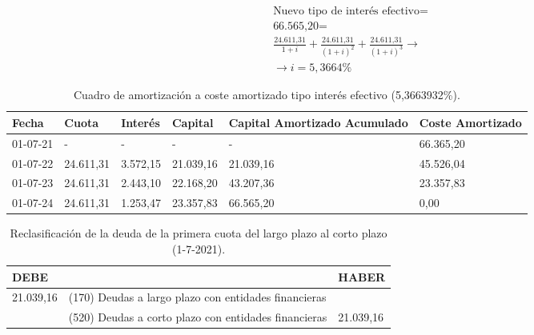 \begin{align*}
    \text{Nuevo tipo de interés efectivo}  = \\
    \text{66.565,20} = \\
    \frac{\text{24.611,31}}{1 + i} + \frac{\text{24.611,31}}{(1 + i)^2} + \frac{\text{24.611,31}}{(1 + i)^3} \rightarrow \\
    \rightarrow i = 5,3664\%
\end{align*}

\begin{table}[H]
    \centering
    \begin{tabular}{|p{2cm}|p{2cm}|p{2cm}|p{2cm}|p{2cm}|p{2cm}|}
    \hline
    \rowcolor{blue!30}
    \textbf{Fecha} & \textbf{Cuota} & \textbf{Interés} & \textbf{Capital} & \textbf{Capital Amortizado Acumulado} & \textbf{Coste Amortizado} \\
    \hline
    01-07-21 & - & - & - & - & 66.365,20 \\
    \hline
    01-07-22 & 24.611,31 & 3.572,15 & 21.039,16 & 21.039,16 & 45.526,04 \\
    \hline
    01-07-23 & 24.611,31 & 2.443,10 & 22.168,20 & 43.207,36 & 23.357,83 \\
    \hline
    01-07-24 & 24.611,31 & 1.253,47 & 23.357,83 & 66.565,20 & 0,00 \\
    \hline
    \end{tabular}
    \caption{Cuadro de amortización a coste amortizado tipo interés efectivo (5,3663932\%).}
    \label{tabla:amortizacion_coste_amortizado}
\end{table}


\begin{table}[H]
    \centering
    \begin{tabular}{|p{2cm}|p{6cm}|p{2cm}|}
    \hline
    \rowcolor{blue!30}
    \textbf{DEBE} & \textbf{} & \textbf{HABER} \\
    \hline
    21.039,16 & (170) Deudas a largo plazo con entidades financieras & \\
    \hline
    & (520) Deudas a corto plazo con entidades financieras&  21.039,16 \\
    \hline
    \end{tabular}
    \caption{Reclasificación de la deuda de la primera cuota del largo plazo al corto plazo (1-7-2021).}
    \label{tabla:reclasificacion}
\end{table}

